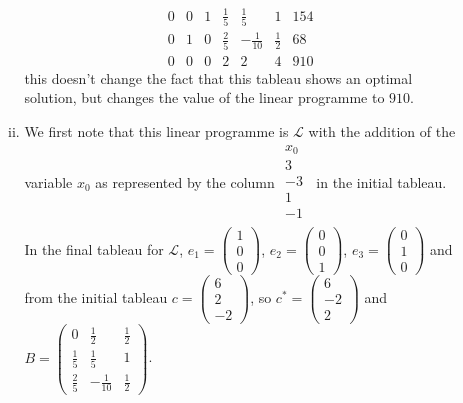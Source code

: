 \documentclass[10pt]{article}
\begin{document}
\begin{enumerate}
\begin{enumerate}
\begin{enumerate}[(i)]
$$\begin{array}{rrrrrr|r}
            0 & 0 & 1 & \tfrac{1}{5} & \tfrac{1}{5} & 1 & 154 \\
            0 & 1 & 0 & \tfrac{2}{5} & -\tfrac{1}{10} & \tfrac{1}{2} & 68 \\
            \hline
            0 & 0 & 0 & 2 & 2 & 4 & 910
          \end{array}
          $$
          this doesn't change the fact that this tableau shows
          an optimal solution, but changes the value of the linear programme to
          $910$.
        \item We first note that this linear programme is $\mathcal{L}$ with
          the addition of the variable $x_0$ as represented by the column
          $
          \begin{array}{r}
            x_0 \\
            \hline
            3  \\
            -3 \\
            1  \\
            \hline
            -1 \\
          \end{array}\
          $ in the initial tableau.
          In the final tableau for $\mathcal{L}$, $e_1 = \left(\begin{smallmatrix} 1 \\ 0 \\ 0 \end{smallmatrix}\right)$,
          $e_2 = \left(\begin{smallmatrix} 0 \\ 0 \\ 1 \end{smallmatrix}\right)$,
          $e_3 = \left(\begin{smallmatrix} 0 \\ 1 \\ 0 \end{smallmatrix}\right)$ and from the initial tableau
          $c = \left(\begin{smallmatrix} 6 \\ 2 \\ -2 \end{smallmatrix}\right)$, so
          $c^* = \left(\begin{smallmatrix} 6 \\ -2 \\ 2 \end{smallmatrix}\right)$ and
          $B = \left(\begin{smallmatrix} 0 & \tfrac{1}{2} & \tfrac{1}{2} \\ \tfrac{1}{5} & \tfrac{1}{5} & 1 \\ \tfrac{2}{5} & -\tfrac{1}{10} & \tfrac{1}{2} \end{smallmatrix}\right)$.


\end{enumerate}
\end{enumerate}
\end{enumerate}
\end{document}
